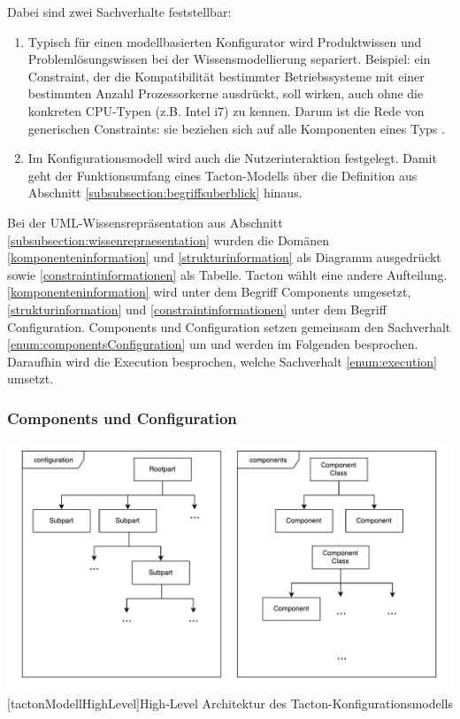 \documentclass[12pt,a4paper,bibliography=totocnumbered,listof=totoc]{scrartcl}
\begin{document}
Dabei sind zwei Sachverhalte feststellbar:
\begin{enumerate}[(1)]
\item \label{enum:componentsConfiguration} Typisch für einen modellbasierten Konfigurator wird Produktwissen und Problemlösungswissen bei der Wissensmodellierung separiert. Beispiel: ein Constraint, der die Kompatibilität bestimmter Betriebssysteme mit einer bestimmten Anzahl Prozessorkerne ausdrückt, soll wirken, auch ohne die konkreten CPU-Typen (z.B. Intel i7) zu kennen. Darum ist die Rede von generischen Constraints: sie beziehen sich auf alle Komponenten eines Typs \citep{felferning14}.
\item \label{enum:execution} Im Konfigurationsmodell wird auch die Nutzerinteraktion festgelegt. Damit geht der Funktionsumfang eines Tacton-Modells über die Definition aus Abschnitt \ref{subsubsection:begriffsuberblick} hinaus.
\end{enumerate}

Bei der UML-Wissensrepräsentation aus Abschnitt \ref{subsubsection:wissenrepraesentation} wurden die Domänen \eqref{komponenteninformation} und \eqref{strukturinformation} als Diagramm ausgedrückt sowie \eqref{constraintinformationen} als Tabelle. Tacton wählt eine andere Aufteilung. \eqref{komponenteninformation} wird unter dem Begriff \glqq Components\grqq{} umgesetzt, \eqref{strukturinformation} und \eqref{constraintinformationen} unter dem Begriff \glqq Configuration\grqq{}. Components und Configuration setzen gemeinsam den Sachverhalt \eqref{enum:componentsConfiguration} um und werden im Folgenden besprochen. Daraufhin wird die \glqq Execution\grqq{} besprochen, welche Sachverhalt \eqref{enum:execution} umsetzt.


\subsubsection{Components und Configuration}

\vspace{1em}
\begin{minipage}{\linewidth}
	\centering
	\includegraphics[width=1\linewidth]{Abbildungen/tactonModellHighLevel.pdf}
	[tactonModellHighLevel]{High-Level Architektur des Tacton-Konfigurationsmodells}
	\label{fig:tactonModellHighLevel}
\end{minipage}
\vspace{1em}
\end{document}
